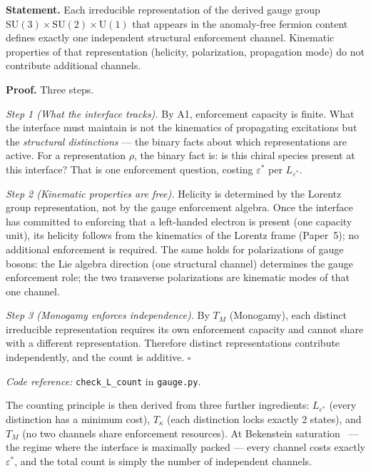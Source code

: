 \documentclass[11pt]{article}
\newcommand{\coderef}[2]{\smallskip\noindent\textit{Code reference:} \texttt{#1} in \texttt{#2}.}
\newcommand{\SU}{\mathrm{SU}}
\newcommand{\U}{\mathrm{U}}
\begin{document}
\begin{tcolorbox}[apfbox, title={Lemma $L_{\mathrm{species}}$ (Species as Enforcement Channels)}]
\textbf{Statement.}  Each irreducible representation of the derived gauge group $\SU(3) \times \SU(2) \times \U(1)$ that appears in the anomaly-free fermion content defines exactly one independent structural enforcement channel.  Kinematic properties of that representation (helicity, polarization, propagation mode) do not contribute additional channels.

\smallskip\noindent\textbf{Proof.}  Three steps.

\textit{Step 1 (What the interface tracks).}  By A1, enforcement capacity is finite.  What the interface must maintain is not the kinematics of propagating excitations but the \emph{structural distinctions} --- the binary facts about which representations are active.  For a representation $\rho$, the binary fact is: is this chiral species present at this interface?  That is one enforcement question, costing $\varepsilon^*$ per $L_{\varepsilon^*}$.

\textit{Step 2 (Kinematic properties are free).}  Helicity is determined by the Lorentz group representation, not by the gauge enforcement algebra.  Once the interface has committed to enforcing that a left-handed electron is present (one capacity unit), its helicity follows from the kinematics of the Lorentz frame (Paper~5); no additional enforcement is required.  The same holds for polarizations of gauge bosons: the Lie algebra direction (one structural channel) determines the gauge enforcement role; the two transverse polarizations are kinematic modes of that one channel.

\textit{Step 3 (Monogamy enforces independence).}  By $T_M$ (Monogamy), each distinct irreducible representation requires its own enforcement capacity and cannot share with a different representation.  Therefore distinct representations contribute independently, and the count is additive.  $\square$

\coderef{check\_L\_count}{gauge.py}
\end{tcolorbox}

The counting principle is then derived from three further ingredients: $L_{\varepsilon^*}$ (every distinction has a minimum cost), $T_\kappa$ (each distinction locks exactly 2 states), and $T_M$ (no two channels share enforcement resources).  At Bekenstein saturation~\cite{Bekenstein1973} --- the regime where the interface is maximally packed --- every channel costs exactly $\varepsilon^*$, and the total count is simply the number of independent channels.
\end{document}
